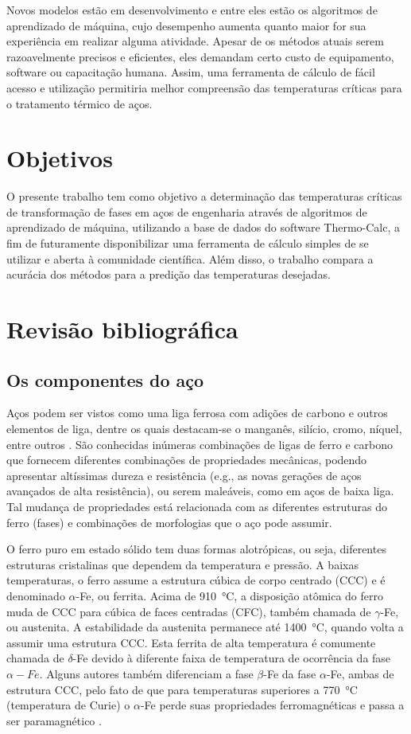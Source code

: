 \documentclass[brazil,tf,epusp]{usp}  %
\begin{document}
Novos modelos estão em desenvolvimento e entre eles estão os algoritmos de aprendizado de máquina, cujo desempenho aumenta quanto maior for sua experiência em realizar alguma atividade. Apesar de os métodos atuais serem razoavelmente precisos e eficientes, eles demandam certo custo de equipamento, software ou capacitação humana. Assim, uma ferramenta de cálculo de fácil acesso e utilização permitiria melhor compreensão das temperaturas críticas para o tratamento térmico de aços.

\chapter{Objetivos}

O presente trabalho tem como objetivo a determinação das temperaturas críticas de transformação de fases em aços de engenharia através de algoritmos de aprendizado de máquina, utilizando a base de dados do software Thermo-Calc\textregistered{}, a fim de futuramente disponibilizar uma ferramenta de cálculo simples de se utilizar e aberta à comunidade científica. Além disso, o trabalho compara a acurácia dos métodos para a predição das temperaturas desejadas.

\chapter{Revisão bibliográfica}

\section{Os componentes do aço}

Aços podem ser vistos como uma liga ferrosa com adições de carbono e outros elementos de liga, dentre os quais destacam-se o manganês, silício, cromo, níquel, entre outros \cite{Dossett2006}. São conhecidas inúmeras combinações de ligas de ferro e carbono que fornecem diferentes combinações de propriedades mecânicas, podendo apresentar altíssimas dureza e resistência (e.g., as novas gerações de aços avançados de alta resistência), ou serem maleáveis, como em aços de baixa liga. Tal mudança de propriedades está relacionada com as diferentes estruturas do ferro (fases) e combinações de morfologias que o aço pode assumir.

O ferro puro em estado sólido tem duas formas alotrópicas, ou seja, diferentes estruturas cristalinas que dependem da temperatura e pressão. A baixas temperaturas, o ferro assume a estrutura cúbica de corpo centrado (CCC) e é denominado $\alpha$-Fe, ou ferrita. Acima de 910~°C, a disposição atômica do ferro muda de CCC para cúbica de faces centradas (CFC), também chamada de $\gamma$-Fe, ou austenita. A estabilidade da austenita permanece até 1400~°C, quando volta a assumir uma estrutura CCC. Esta ferrita de alta temperatura é comumente chamada de $\delta$-Fe devido à diferente faixa de temperatura de ocorrência da fase $\alpha-Fe$. Alguns autores também diferenciam a fase $\beta$-Fe da fase $\alpha$-Fe, ambas de estrutura CCC, pelo fato de que para temperaturas superiores a 770~°C (temperatura de Curie) o $\alpha$-Fe perde suas propriedades ferromagnéticas e passa a ser paramagnético \cite{Totten2006}.
\end{document}

